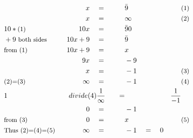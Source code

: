 \begin{alignat*}{5}
&\,&x\quad&=\quad&&\bar{9}&&\small\text{(1)}\\
&\,&x\quad&=&&\infty&&\small\text{(2)}\\
&\small10*\text{(1)}&10x\quad&=&&\bar{9}0\\
&\small+9\text{ both sides}\qquad&10x+9\quad&=&&\bar{9}\\
&\small\text{from (1)}&10x+9\quad&=&&x\\
&\,&9x\quad&=&&-9\\
&\,&x\quad&=&&-1\qquad&&\small\text{(3)}\\
&\small\text{(2)=(3)}&\infty\quad&=&&-1&&\small\text{(4)}\\
&\small1&divide\text{(4)}&\frac{1}{\infty}\quad&=&&\frac{1}{-1}\\
&\,&0\quad&=&&-1\\
&\small\text{from (3)}&0\quad&=&&x&&\small\text{(5)}\\
&\small\text{Thus (2)=(4)=(5)}&\infty\quad&=&&-1\quad=\quad0
\end{alignat*}
